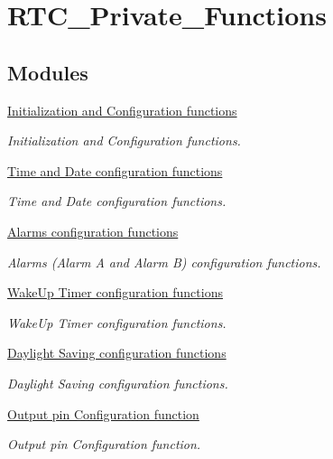 \hypertarget{group___r_t_c___private___functions}{}\section{R\+T\+C\+\_\+\+Private\+\_\+\+Functions}
\label{group___r_t_c___private___functions}
\subsection*{Modules}
\begin{DoxyCompactItemize}
\item 
\hyperlink{group___r_t_c___group1}{Initialization and Configuration functions}
\begin{DoxyCompactList}\small\item\em Initialization and Configuration functions. \end{DoxyCompactList}\item 
\hyperlink{group___r_t_c___group2}{Time and Date configuration functions}
\begin{DoxyCompactList}\small\item\em Time and Date configuration functions. \end{DoxyCompactList}\item 
\hyperlink{group___r_t_c___group3}{Alarms configuration functions}
\begin{DoxyCompactList}\small\item\em Alarms (Alarm A and Alarm B) configuration functions. \end{DoxyCompactList}\item 
\hyperlink{group___r_t_c___group4}{Wake\+Up Timer configuration functions}
\begin{DoxyCompactList}\small\item\em Wake\+Up Timer configuration functions. \end{DoxyCompactList}\item 
\hyperlink{group___r_t_c___group5}{Daylight Saving configuration functions}
\begin{DoxyCompactList}\small\item\em Daylight Saving configuration functions. \end{DoxyCompactList}\item 
\hyperlink{group___r_t_c___group6}{Output pin Configuration function}
\begin{DoxyCompactList}\small\item\em Output pin Configuration function. \end{DoxyCompactList}\item 

\end{DoxyCompactItemize}
